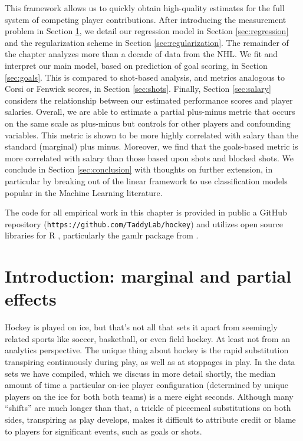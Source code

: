 This framework allows us to quickly obtain high-quality estimates for the full
system of competing player contributions. After introducing the  measurement
problem in Section \ref{sec:intro}, we detail our regression model in Section
\ref{sec:regression} and the regularization scheme in Section
\ref{sec:regularization}.  The remainder of the chapter analyzes more than a
decade of data from the NHL.  We fit and interpret our main model, based on
prediction of goal scoring, in Section \ref{sec:goals}.  This is compared to
shot-based analysis, and metrics analogous to Corsi or Fenwick scores, in
Section \ref{sec:shots}.  Finally, Section \ref{sec:salary} considers the
relationship between our estimated  performance scores and  player salaries.
Overall, we are able to estimate a partial plus-minus metric that occurs on
the same scale as plus-minus but controls for other players and confounding
variables.  This metric is shown to be more highly correlated with salary than
the standard (marginal) plus minus.  Moreover, we find that the goals-based
metric is more correlated with salary than those based upon shots and blocked
shots.   We conclude in Section \ref{sec:conclusion} with thoughts on further
extension, in particular by breaking out of the linear framework to use
classification models popular in the Machine Learning literature.

The code for all empirical work in this chapter is provided in public a GitHub
repository (\verb!https://github.com/TaddyLab/hockey!) and utilizes open
source libraries for {\sf R} \cite{cranR}, particularly the {\sf gamlr} \cite{gamlr} package from \cite{taddy_one-step_2015}.


\section{Introduction: marginal and partial effects}
\label{sec:intro}

Hockey is played on ice, but that's not all that sets it apart from seemingly
related  sports like soccer, basketball, or even field hockey.  At least not
from an analytics perspective.  The unique thing about hockey is the rapid
substitution transpiring continuously during play, as well as at stoppages in
play.  In the data sets we have compiled, which we discuss in more detail
shortly, the median amount of time a particular on-ice player configuration
(determined by unique players on the ice for both both teams) is a mere eight
seconds. Although many ``shifts'' are much longer than that, a trickle of
piecemeal substitutions on both sides, transpiring as play develops, makes it
difficult to attribute credit or blame to players for significant events, such
as goals or shots.

